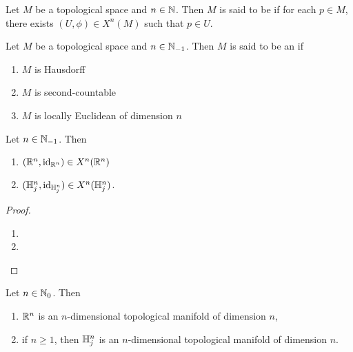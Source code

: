 \documentclass{book}
\begin{document}

	\begin{defn} 
		Let $M$ be a topological space and $n \in \mathbb{N}$. Then $M$ is said to be  if for each $p \in M$, there exists $(U, \phi) \in X^n(M)$ such that $p \in U$. 
	\end{defn}

	\begin{defn} 
		Let $M$ be a topological space and $n \in \mathbb{N}_{-1}$. Then $M$ is said to be an  if 
		\begin{enumerate}
			\item $M$ is Hausdorff
			\item $M$ is second-countable
			\item $M$ is locally Euclidean of dimension $n$
		\end{enumerate}
	\end{defn}

	\begin{ex} 
		Let $n \in \mathbb{N}_{-1}$. Then
		\begin{enumerate}
			\item $(\mathbb{R}^n, \operatorname{id}_{\mathbb{R}^n}) \in X^n(\mathbb{R}^n)$
			\item $(\mathbb{H}^n_j , \operatorname{id}_{\mathbb{H}^n_j }) \in X^n(\mathbb{H}^n_j )$.
		\end{enumerate}
	\end{ex}
	
	\begin{proof}\
		\begin{enumerate}
			\item 
			\item 
		\end{enumerate}
	\end{proof}

	\begin{ex} 
		Let $n \in \mathbb{N}_0$. Then
		\begin{enumerate}
			\item $\mathbb{R}^n$ is an $n$-dimensional topological manifold of dimension $n$,
			\item if $n \geq 1$, then $\mathbb{H}^n_j $ is an $n$-dimensional topological manifold of dimension $n$.
				\tcr{fix}
		\end{enumerate}
	\end{ex}
\end{document}
